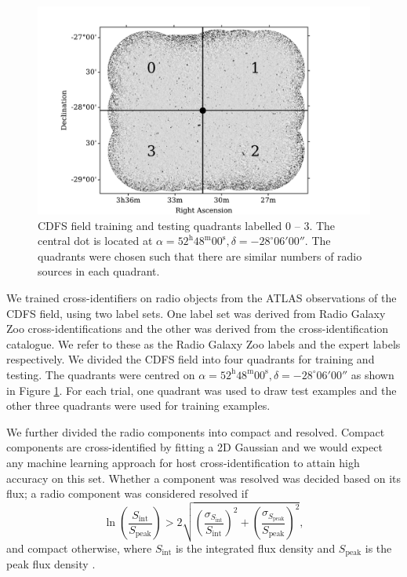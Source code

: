 \documentclass[fleqn,usenatbib,usedcolumn]{mnras}
\newcommand{\text}{\mathrm}
\begin{document}
    \begin{figure}
      \centering
      \includegraphics[width=\columnwidth]{images/quadrants.pdf}
      \caption{CDFS field training and testing quadrants labelled 0 -- 3. The
        central dot is located at $\alpha = 52^\text{h}48^\text{m}00^\text{s},
        \delta = -28^\circ{}06'00''$. The quadrants were chosen such that
        there are similar numbers of radio sources in each
        quadrant.\label{fig:quadrants}}
    \end{figure}

    We trained cross-identifiers on radio objects from the ATLAS observations of
    the CDFS field, using two label sets. One label set was derived from Radio
    Galaxy Zoo cross-identifications and the other was derived from the
    \citet{norris06} cross-identification catalogue. We refer to these as the
    Radio Galaxy Zoo labels and the expert labels respectively. We divided the
    CDFS field into four quadrants for training and testing. The quadrants were
    centred on $\alpha = 52^\text{h}48^\text{m}00^\text{s},
    \delta = -28^\circ{}06'00''$ as shown in Figure \ref{fig:quadrants}. For
    each trial, one quadrant was used to draw test examples and the other three
    quadrants were used for training examples.

    We further divided the radio components into compact and resolved. Compact
    components are cross-identified by fitting a 2D Gaussian \citep[as
    in][]{norris06} and we would expect any machine learning approach for host
    cross-identification to attain high accuracy on this set. Whether a
    component was resolved was decided based on its flux; a radio component was
    considered resolved if
    \begin{equation}
        \ln \left(
          \frac{S_{\text{int}}}
               {S_{\text{peak}}}
        \right) > 2\sqrt{\left(
          \frac{\sigma_{S_{\text{int}}}}
               {S_{\text{int}}}
        \right)^2 + \left(
          \frac{\sigma_{S_{\text{peak}}}}
               {S_{\text{peak}}}
        \right)^2},
    \end{equation}%
    and compact otherwise, where \(S_{\text{int}}\) is the integrated flux
    density and \(S_{\text{peak}}\) is the peak flux density
    \citep{franzen15}.
\end{document}
